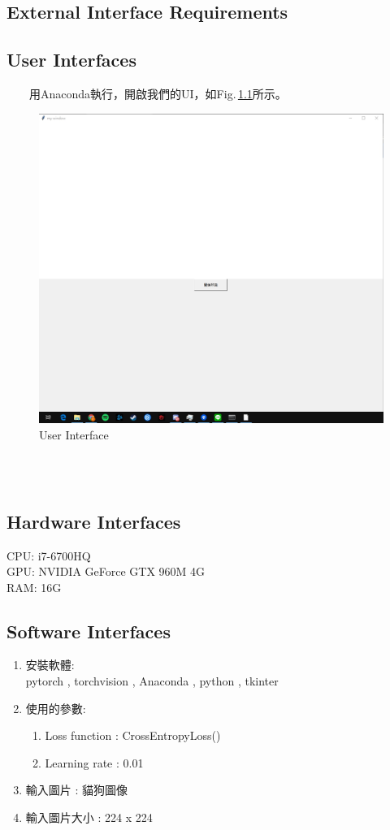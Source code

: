 \documentclass{scrreprt}
\begin{document}
\begin{CJK*}{UTF8}{bsmi}
\chapter{External Interface Requirements}

\section{User Interfaces}
　　用Anaconda執行，開啟我們的UI，如Fig.\,\ref{fig:3.1}所示。
\begin{figure}[h]
\begin{center}
\includegraphics[width=12.5cm]{UI.jpg} 
\end{center} 
\label{fig:3.1} 
\caption{User Interface} 
\end{figure}
　　\\
　　\\
\section{Hardware Interfaces}
CPU: i7-6700HQ\\
GPU: NVIDIA GeForce GTX 960M 4G\\
RAM: 16G\\


\section{Software Interfaces}
\begin{enumerate}
	\item 安裝軟體:\\pytorch , torchvision , Anaconda , python , tkinter  
	\item 使用的參數:
	\begin{enumerate}
		\item Loss function : CrossEntropyLoss()
		\item Learning rate :  0.01
	\end{enumerate}
	\item 輸入圖片 : 貓狗圖像
	\item 輸入圖片大小 : 224 x 224
\end{enumerate}




\end{CJK*}
\end{document}
